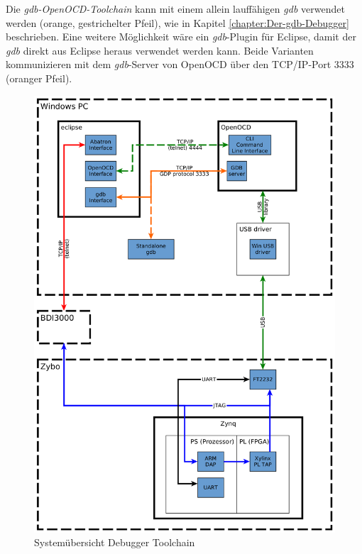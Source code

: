 Die \textit{gdb-OpenOCD-Toolchain} kann mit einem allein lauffähigen \textit{gdb} verwendet werden (orange, gestrichelter Pfeil), wie in Kapitel \ref{chapter:Der-gdb-Debugger} beschrieben.
Eine weitere Möglichkeit wäre ein \textit{gdb}-Plugin für Eclipse, damit der \textit{gdb} direkt aus Eclipse heraus verwendet werden kann.
Beide Varianten kommunizieren mit dem \textit{gdb}-Server von OpenOCD über den TCP/IP-Port 3333 (oranger Pfeil).


\begin{figure}[htbp]
	\centering
		\includegraphics[width=\textwidth,height=\textheight,keepaspectratio]{graphs/embeddedDebuggerToolchain.png}
	\caption{Systemübersicht Debugger Toolchain}
	\label{fig:UebersichtDebuggerToolchain}
\end{figure}



